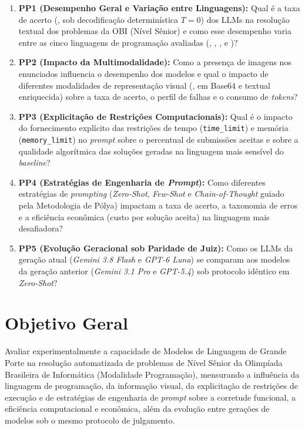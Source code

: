 \begin{enumerate}
    \item \textbf{PP1 (Desempenho Geral e Variação entre Linguagens):} Qual é a taxa de acerto (, sob decodificação determinística $T = 0$) dos LLMs na resolução textual dos problemas da OBI (Nível Sênior) e como esse desempenho varia entre as cinco linguagens de programação avaliadas (, , ,  e )?
    \item \textbf{PP2 (Impacto da Multimodalidade):} Como a presença de imagens nos enunciados influencia o desempenho dos modelos e qual o impacto de diferentes modalidades de representação visual (,  em Base64 e  textual enriquecida) sobre a taxa de acerto, o perfil de falhas e o consumo de \textit{tokens}?
    \item \textbf{PP3 (Explicitação de Restrições Computacionais):} Qual é o impacto do fornecimento explícito das restrições de tempo (\texttt{time\_limit}) e memória (\texttt{memory\_limit}) no \textit{prompt} sobre o percentual de submissões aceitas e sobre a qualidade algorítmica das soluções geradas na linguagem mais sensível do \textit{baseline}?
    \item \textbf{PP4 (Estratégias de Engenharia de \textit{Prompt}):} Como diferentes estratégias de \textit{prompting} (\textit{Zero-Shot}, \textit{Few-Shot} e \textit{Chain-of-Thought} guiado pela Metodologia de Pólya) impactam a taxa de acerto, a taxonomia de erros e a eficiência econômica (custo por solução aceita) na linguagem mais desafiadora?
    \item \textbf{PP5 (Evolução Geracional sob Paridade de Juiz):} Como os LLMs da geração atual (\textit{Gemini 3.8 Flash} e \textit{GPT-6 Luna}) se comparam aos modelos da geração anterior (\textit{Gemini 3.1 Pro} e \textit{GPT-5.4}) sob protocolo idêntico em  \textit{Zero-Shot}?
\end{enumerate}

\section{Objetivo Geral}\label{sec:intro-objetivo}

Avaliar experimentalmente a capacidade de Modelos de Linguagem de Grande Porte na resolução automatizada de problemas de Nível Sênior da Olimpíada Brasileira de Informática (Modalidade Programação), mensurando a influência da linguagem de programação, da informação visual, da explicitação de restrições de execução e de estratégias de engenharia de \textit{prompt} sobre a corretude funcional, a eficiência computacional e econômica, além da evolução entre gerações de modelos sob o mesmo protocolo de julgamento.

